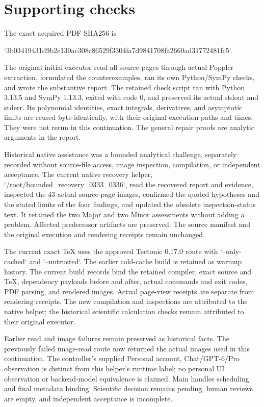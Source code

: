 \documentclass[10pt]{article}
\begin{document}
\section*{Supporting checks}
The exact acquired PDF SHA256 is\par
`3b03419431d9b2e130ac308c86529f3304fa7d9841708fa2660ad31772481fc5`.\par
The original initial executor read all source pages through actual Poppler extraction, formulated the counterexamples, ran its own Python/SymPy checks, and wrote the substantive report. The retained check script ran with Python 3.13.5 and SymPy 1.13.3, exited with code 0, and preserved its actual stdout and stderr. Its polynomial identities, exact integrals, derivatives, and asymptotic limits are reused byte-identically, with their original execution paths and times. They were not rerun in this continuation. The general repair proofs are analytic arguments in the report.\par
Historical native assistance was a bounded analytical challenge, separately recorded without source-file access, image inspection, compilation, or independent acceptance. The current native recovery helper, `/root/bounded\_recovery\_0333\_0336`, read the recovered report and evidence, inspected the 43 actual source-page images, confirmed the quoted hypotheses and the stated limits of the four findings, and updated the obsolete inspection-status text. It retained the two Major and two Minor assessments without adding a problem. Affected predecessor artifacts are preserved. The source manifest and the original execution and rendering receipts remain unchanged.\par
The current exact TeX uses the approved Tectonic 0.17.0 route with `--only-cached` and `--untrusted`. The earlier cold-cache build is retained as warmup history. The current build records bind the retained compiler, exact source and TeX, dependency payloads before and after, actual commands and exit codes, PDF parsing, and rendered images. Actual page-view receipts are separate from rendering receipts. The new compilation and inspections are attributed to the native helper; the historical scientific calculation checks remain attributed to their original executor.\par
Earlier read and image failures remain preserved as historical facts. The previously failed image-read route now returned the actual images used in this continuation. The controller’s supplied Personal account, Chat/GPT-6/Pro observation is distinct from this helper’s runtime label; no personal UI observation or backend-model equivalence is claimed. Main handles scheduling and final metadata binding. Scientific decision remains pending, human reviews are empty, and independent acceptance is incomplete.\par
\end{document}
